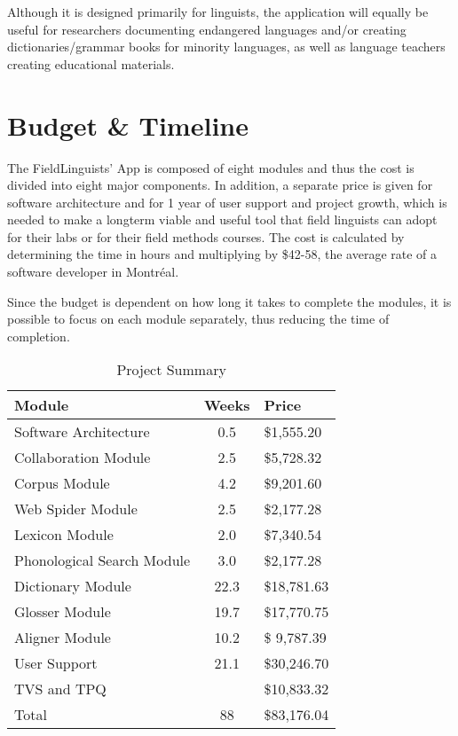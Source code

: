 \documentclass[12 pt]{article}
\begin{document}
Although it is designed primarily for linguists, the application will equally be useful for researchers documenting endangered languages and/or creating dictionaries/grammar books for minority languages, as well as language teachers creating educational materials.  





\section {Budget \& Timeline}

The FieldLinguists' App is composed of eight modules and thus the cost is divided into eight major components. In addition, a separate price is given for software architecture and for 1 year of user support and project growth, which is needed to make a longterm viable and useful tool that field linguists can adopt for their labs or for their field methods courses. The cost is calculated by determining the time in hours and multiplying by \$42-58, the average rate of a software developer in Montr\'eal. 

Since the budget is dependent on how long it takes to complete the modules, it is possible to focus on each module separately, thus reducing the time of completion. 

 

\begin{table}[htbp]
\begin{center}
  \begin{tabular}{ | lcl | }
\hline
    Module & Weeks & Price\\ 
\hline
    Software Architecture & 0.5  & \$1,555.20  \\ 
    Collaboration Module & 2.5  & \$5,728.32  \\ 
    Corpus Module & 4.2 & \$9,201.60 \\
     Web Spider Module  & 2.5 & \$2,177.28\\
      Lexicon Module & 2.0 & \$7,340.54 \\ 
     Phonological Search Module & 3.0 & \$2,177.28 \\
    Dictionary Module & 22.3 & \$18,781.63 \\
        Glosser Module & 19.7 & \$17,770.75 \\
Aligner Module & 10.2 & \$ 9,787.39\\ 
User Support & 21.1 & \$30,246.70 \\
TVS and TPQ &  & \$10,833.32 \\
Total &  88 &\$83,176.04\\

\hline
  \end{tabular}
  \caption{Project Summary}
  \label{tab:label}
  \end{center}
\end{table}
\end{document}
